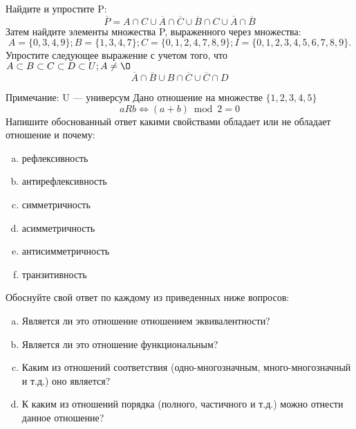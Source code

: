 \documentclass[10pt]{exam}
\begin{document}
\begin{questions}
\question
Найдите и упростите P:
\begin{equation*}
\overline{P} = A \cap C \cup \overline{A} \cap \overline{C} \cup \overline{B} \cap C \cup \overline{A} \cap \overline{B}
\end{equation*}
Затем найдите элементы множества P, выраженного через множества:
\begin{equation*}
A = \{0, 3, 4, 9\}; 
B = \{1, 3, 4, 7\};
C = \{0, 1, 2, 4, 7, 8, 9\};
I = \{0, 1, 2, 3, 4, 5, 6, 7, 8, 9\}.
\end{equation*}\question
Упростите следующее выражение с учетом того, что $A\subset B \subset C \subset D \subset U; A \neq \O$
\begin{equation*}
\overline{A} \cap \overline{B} \cup B \cap \overline{C} \cup \overline{C} \cap D
\end{equation*}

Примечание: U — универсум\question
Дано отношение на множестве $\{1, 2, 3, 4, 5\}$ 
\begin{equation*}
aRb \iff (a+b) \bmod 2 =0
\end{equation*}
Напишите обоснованный ответ какими свойствами обладает или не обладает отношение и почему:   
\begin{enumerate} [a)]\setcounter{enumi}{0}
\item рефлексивность
\item антирефлексивность
\item симметричность
\item асимметричность
\item антисимметричность
\item транзитивность
\end{enumerate}

Обоснуйте свой ответ по каждому из приведенных ниже вопросов:
\begin{enumerate} [a)]\setcounter{enumi}{0}
    \item Является ли это отношение отношением эквивалентности?
    \item Является ли это отношение функциональным?
    \item Каким из отношений соответствия (одно-многозначным, много-многозначный и т.д.) оно является?
    \item К каким из отношений порядка (полного, частичного и т.д.) можно отнести данное отношение?
\end{enumerate}




\end{questions}
\end{document}

